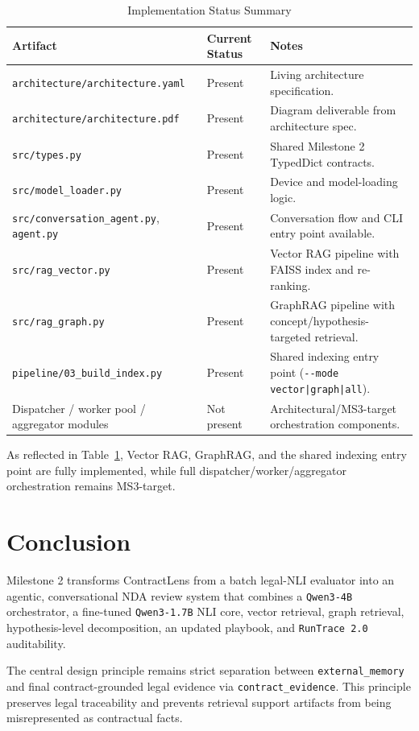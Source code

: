 \documentclass[11pt]{article}
\begin{document}
\begin{table}[htbp]
\centering
\caption{Implementation Status Summary}
\label{tab:impl-status}
\small
\begin{tabularx}{\textwidth}{>{\raggedright\arraybackslash}p{4.0cm} >{\raggedright\arraybackslash}p{2.6cm} >{\raggedright\arraybackslash}X}
\toprule
\textbf{Artifact} & \textbf{Current Status} & \textbf{Notes} \\
\midrule
\texttt{architecture/architecture.yaml} & Present & Living architecture specification. \\
\texttt{architecture/architecture.pdf} & Present & Diagram deliverable from architecture spec. \\
\texttt{src/types.py} & Present & Shared Milestone 2 TypedDict contracts. \\
\texttt{src/model\_loader.py} & Present & Device and model-loading logic. \\
\texttt{src/conversation\_agent.py}, \texttt{agent.py} & Present & Conversation flow and CLI entry point available. \\
\texttt{src/rag\_vector.py} & Present & Vector RAG pipeline with FAISS index and re-ranking. \\
\texttt{src/rag\_graph.py} & Present & GraphRAG pipeline with concept/hypothesis-targeted retrieval. \\
\texttt{pipeline/03\_build\_index.py} & Present & Shared indexing entry point (\texttt{-{}-mode vector|graph|all}). \\
Dispatcher / worker pool / aggregator modules & Not present & Architectural/MS3-target orchestration components. \\
\bottomrule
\end{tabularx}
\end{table}

As reflected in Table~\ref{tab:impl-status}, Vector RAG, GraphRAG, and the shared indexing entry point are fully implemented, while full dispatcher/worker/aggregator orchestration remains MS3-target.

\section{Conclusion}
Milestone 2 transforms ContractLens from a batch legal-NLI evaluator into an agentic, conversational NDA review system that combines a \texttt{Qwen3-4B} orchestrator, a fine-tuned \texttt{Qwen3-1.7B} NLI core, vector retrieval, graph retrieval, hypothesis-level decomposition, an updated playbook, and \texttt{RunTrace 2.0} auditability.

The central design principle remains strict separation between \texttt{external\_memory} and final contract-grounded legal evidence via \texttt{contract\_evidence}. This principle preserves legal traceability and prevents retrieval support artifacts from being misrepresented as contractual facts.
\end{document}
